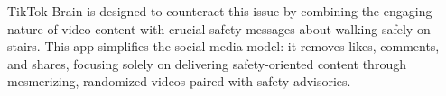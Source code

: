 \documentclass{article}
\begin{document}
TikTok-Brain is designed to counteract this issue by combining the engaging nature of video content
with crucial safety messages about walking safely on stairs.
This app simplifies the social media model: it removes likes, comments, and shares,
focusing solely on delivering safety-oriented content through mesmerizing, randomized videos paired with safety advisories.








\end{document}
